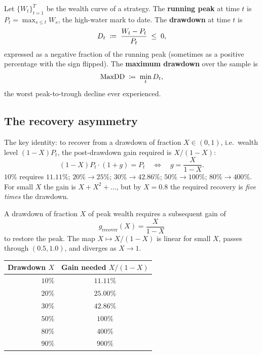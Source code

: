 Let $\{W_t\}_{t=1}^T$ be the wealth curve of a strategy. The
\textbf{running peak} at time $t$ is $P_t = \max_{s \leq t} W_s$,
the high-water mark to date. The \textbf{drawdown} at time $t$ is
\begin{equation}
  D_t \;\coloneqq\; \frac{W_t - P_t}{P_t} \;\leq\; 0,
\end{equation}
expressed as a negative fraction of the running peak (sometimes
as a positive percentage with the sign flipped). The
\textbf{maximum drawdown} over the sample is
\begin{equation}
  \text{MaxDD} \;\coloneqq\; \min_{t} D_t,
\end{equation}
the worst peak-to-trough decline ever experienced.

\subsection{The recovery asymmetry}

The key identity: to recover from a drawdown of fraction $X \in
(0,1)$, i.e.\ wealth level $(1-X)P_t$, the post-drawdown gain
required is $X/(1-X)$:
\begin{equation}
  (1 - X)P_t \cdot (1 + g) = P_t
  \quad\Longleftrightarrow\quad
  g = \frac{X}{1 - X}.
\end{equation}
$10\%$ requires $11.11\%$; $20\% \to 25\%$; $30\% \to 42.86\%$;
$50\% \to 100\%$; $80\% \to 400\%$. For small $X$ the gain is
$X + X^2 + \ldots$, but by $X = 0.8$ the required recovery is
\emph{five times} the drawdown.

\begin{keyfactbox}
A drawdown of fraction $X$ of peak wealth requires a subsequent
gain of
\[
  g_{\text{recover}}(X) = \frac{X}{1 - X}
\]
to restore the peak. The map $X \mapsto X/(1-X)$ is linear for
small $X$, passes through $(0.5, 1.0)$, and diverges as $X \to 1$.
\begin{center}
\begin{tabular}{rc}
\toprule
Drawdown $X$ & Gain needed $X/(1-X)$ \\
\midrule
$10\%$  & $11.11\%$  \\
$20\%$  & $25.00\%$  \\
$30\%$  & $42.86\%$  \\
$50\%$  & $100\%$   \\
$80\%$  & $400\%$   \\
$90\%$  & $900\%$   \\
\bottomrule
\end{tabular}
\end{center}
\end{keyfactbox}

